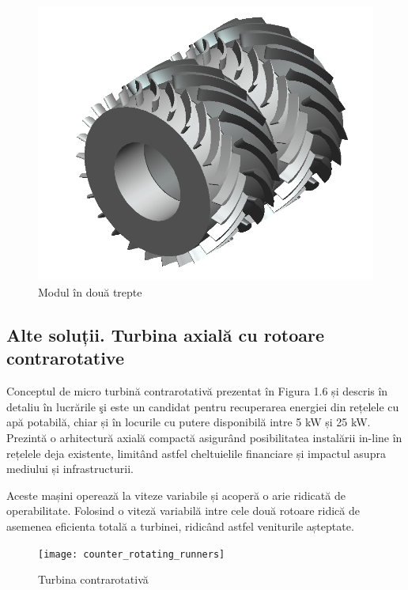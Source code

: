 \begin{figure}[h!]
	\centering
	\includegraphics[scale=0.6]{figures/modul_in_doua_trepte.png}
	\caption{Modul în două trepte \cite{susanhub}}
	\label{Modul în două trepte}
\end{figure}



\subsection{Alte soluții. Turbina axială cu rotoare contrarotative}

Conceptul de micro turbină contrarotativă prezentat în Figura 1.6 și descris în detaliu în lucrările \cite{andolfatto2016simulation} \c{s}i \cite{andolfatto2015mixed} este un candidat pentru recuperarea energiei din rețelele cu apă potabilă, chiar și în locurile cu putere disponibilă intre 5 kW și 25 kW. Prezintă o arhitectură axială compactă asigurând posibilitatea instalării in-line în rețelele deja existente, limitând astfel cheltuielile financiare și impactul asupra mediului și infrastructurii.

Aceste mașini operează la viteze variabile și acoperă o arie ridicată de operabilitate. Folosind o viteză variabilă intre cele două rotoare ridică de asemenea eficienta totală a turbinei, ridicând astfel veniturile așteptate.

\begin{figure}[h!]
	\centering
	\texttt{[image: counter\_rotating\_runners]}
	\caption{Turbina contrarotativă \cite{andolfatto2016simulation}}
	\label{Turbina contrarotativă}
\end{figure}

